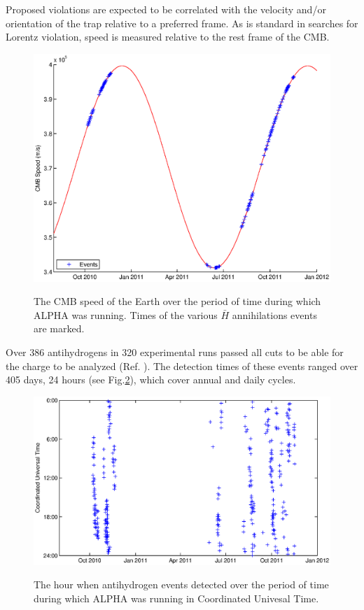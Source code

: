 \documentclass[superscriptaddress,aps,prb,11pt]{revtex4-1}
\begin{document}
Proposed violations are expected to be correlated with the velocity and/or orientation of the trap relative to a preferred frame.  As is standard in searches for Lorentz violation, speed is measured relative to the rest frame of the CMB.

\begin{figure}
  \includegraphics[scale=0.3]{True_Event_Distribution.eps}
  \label{fig:true_event_distribution}
  \caption{The CMB speed of the Earth over the period of time during which ALPHA was running.  Times of the various $\bar{H}$ annihilations events are marked.}
\end{figure}

Over 386 antihydrogens in 320 experimental runs passed all cuts to be able for the charge to be analyzed (Ref. ). The detection times of these events ranged over 405 days, 24 hours (see Fig.\ref{fig:eventTime_date_experiment}), which cover annual and daily cycles.

\begin{figure}
  \includegraphics[scale=0.6]{eventTime_date_experiment.eps}
  \label{fig:eventTime_date_experiment}
  \caption{The hour when antihydrogen events detected over the period of time during which ALPHA was running in Coordinated Univesal Time.}
\end{figure}
\end{document}
